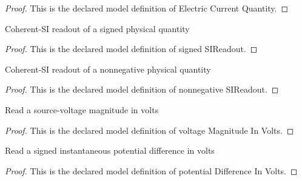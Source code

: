 \begin{proof}
  This is the declared model definition of Electric Current Quantity.
\end{proof}
\begin{definition}
  \label{def:physics:phyx-mini-0934:phyxminiproblems-problemphyxmini0934-signedsireadout}
  Coherent-SI readout of a signed physical quantity
\end{definition}
\begin{proof}
  This is the declared model definition of signed SIReadout.
\end{proof}
\begin{definition}
  \label{def:physics:phyx-mini-0934:phyxminiproblems-problemphyxmini0934-nonnegativesireadout}
  Coherent-SI readout of a nonnegative physical quantity
\end{definition}
\begin{proof}
  This is the declared model definition of nonnegative SIReadout.
\end{proof}
\begin{definition}
  \label{def:physics:phyx-mini-0934:phyxminiproblems-problemphyxmini0934-voltagemagnitudeinvolts}
  Read a source-voltage magnitude in volts
\end{definition}
\begin{proof}
  This is the declared model definition of voltage Magnitude In Volts.
\end{proof}
\begin{definition}
  \label{def:physics:phyx-mini-0934:phyxminiproblems-problemphyxmini0934-potentialdifferenceinvolts}
  Read a signed instantaneous potential difference in volts
\end{definition}
\begin{proof}
  This is the declared model definition of potential Difference In Volts.
\end{proof}

